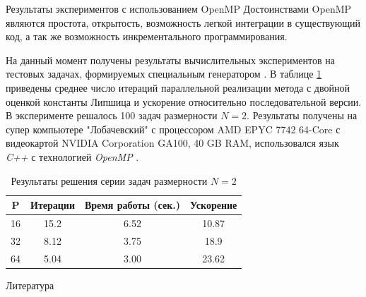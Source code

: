 \documentclass{beamer}
\begin{document}
\begin{frame}[t]
\begin{columns}[t]
\begin{column}[t]{0.47\paperwidth}
\begin{block}{Результаты экспериментов с использованием OpenMP}
 Достоинствами OpenMP являются простота, открытость, возможность легкой интеграции в существующий код, а так же возможность инкрементального программирования.
 
На данный момент получены результаты вычислительных экспериментов на тестовых задачах, формируемых специальным генератором \cite{GKLS}. В таблице \ref{table:GKLS_RES_1} приведены среднее число итераций параллельной реализации метода с двойной оценкой константы Липшица и ускорение относительно последовательной версии. В эксперименте решалось 100 задач размерности \(N = 2\). Результаты получены на супер компьютере "Лобачевский" с процессором AMD EPYC 7742 64-Core с видеокартой NVIDIA Corporation GA100, 40 GB RAM, использовался язык \textit{C++} с технологией \textit{OpenMP} .



\begin{table}[!hbp]
    \centering
    \caption{Результаты решения серии задач размерности $N=2$}
     \renewcommand{\arraystretch}{1.4}
    \renewcommand{\tabcolsep}{1cm}
    \begin{tabular}{|c|c|c|c|}
    \hline
    P  & Итерации  & Время работы (сек.) & Ускорение \\ \hline
        16 & 15.2 & 6.52 & 10.87  \\ \hline
	32 & 8.12 & 3.75 & 18.9  \\ \hline
	64 & 5.04 & 3.00 & 23.62 \\ \hline
	\end{tabular}
    
    \label{table:GKLS_RES_1}
\end{table}

\end{block}
          \begin{block}{Литература}
            \printbibliography

            
          \end{block}
        \end{column}
    \end{columns}
\end{frame}
\end{document}
